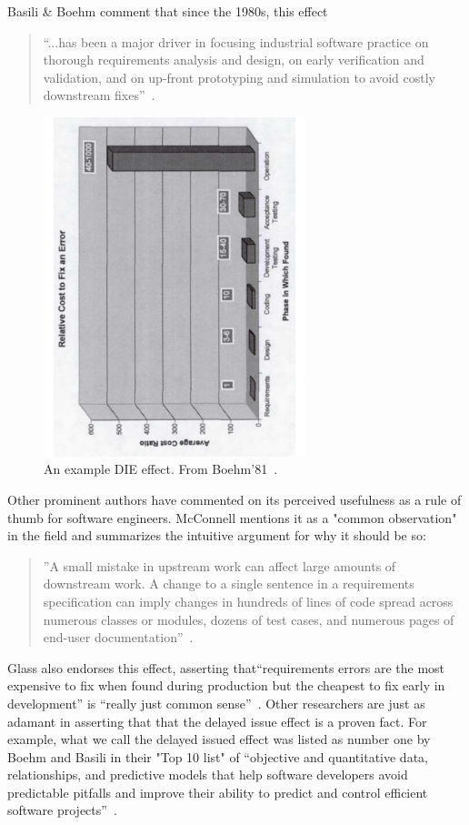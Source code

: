 \documentclass{sig-alternate}
\begin{document}
 Basili \& Boehm comment that since the 1980s,  this effect
 \begin{quote}
``...has been a major driver in focusing
industrial software practice on thorough
requirements analysis and design,
on early verification and validation, and
on up-front prototyping and simulation
to avoid costly downstream fixes''~\cite{boehm01}.
\end{quote}
 \begin{figure}[!b]  
\begin{center}
\includegraphics[angle=270,width=3in]{img/b81.pdf}
 \end{center}
 \caption{An example DIE effect. From Boehm'81~\cite{Boehm81}. }\label{fig:b81}
 \end{figure}
Other prominent authors have commented on its perceived usefulness as a rule of thumb for software engineers.  McConnell mentions it as a "common observation" in the field and  summarizes the intuitive argument for why it should be so: 
\begin{quote}
''A small mistake in upstream work can affect large amounts of downstream work. A change to a single sentence in a requirements specification can imply changes in hundreds of lines of code spread across numerous classes or modules, dozens of test cases, and numerous pages of end-user documentation''~\cite{mcconnell01}. 
\end{quote}
Glass also endorses this effect, asserting that``requirements errors are the most expensive to fix when found during production but the cheapest to fix early in development'' is ``really just common sense''~\cite{glass02}.  Other researchers
are just as adamant in asserting that that the delayed issue effect is a proven
fact.
For example, what we call the delayed issued effect was listed as number one by Boehm and Basili in their "Top 10 list" of ``objective and quantitative data, relationships,
and predictive models that help
software developers avoid predictable pitfalls
and improve their ability to predict
and control efficient software projects''~\cite{boehm01}.
 
\end{document}
